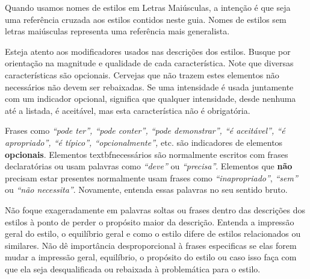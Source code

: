 Quando usamos nomes de estilos em Letras Maiúsculas, a intenção é que seja uma referência cruzada aos estilos contidos neste guia. Nomes de estilos sem letras maiúsculas representa uma referência mais generalista.

Esteja atento aos modificadores usados nas descrições dos estilos. Busque por orientação na magnitude e qualidade de cada característica. Note que diversas características são opcionais. Cervejas que não trazem estes elementos não necessários não devem ser rebaixadas. Se uma intensidade é usada juntamente com um indicador opcional, significa que qualquer intensidade, desde nenhuma até a listada, é aceitável, mas esta característica não é obrigatória.

Frases como \textit{“pode ter”, “pode conter”, “pode demonstrar”, “é aceitável”, “é apropriado”, “é típico”, “opcionalmente”,} etc. são indicadores de elementos \textbf{opcionais}. Elementos textbf{necessários} são normalmente escritos com frases declaratórias ou usam palavras como \textit{“deve”} ou \textit{“precisa”}. Elementos que \textbf{não} precisam estar presentes normalmente usam frases como \textit{“inapropriado”}, \textit{“sem”} ou \textit{“não necessita”}. Novamente, entenda essas palavras no seu sentido bruto.

Não foque exageradamente em palavras soltas ou frases dentro das descrições dos estilos à ponto de perder o propósito maior da descrição. Entenda a impressão geral do estilo, o equilíbrio geral e como o estilo difere de estilos relacionados ou similares. Não dê importância desproporcional à frases especificas se elas forem mudar a impressão geral, equilíbrio, o propósito do estilo ou caso isso faça com que ela seja desqualificada ou rebaixada à problemática para o estilo.
